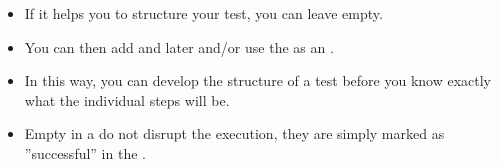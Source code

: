 

\begin{itemize}
\item If it helps you to structure your test, you can leave \gdcases{} empty.
\item You can then add \gdsteps{} and \gdcases{} later and/or use the \gdcase{} as an \gdehandler{}.
\item In this way, you can develop the structure of a test before you know exactly what the individual steps will be. 
\item Empty \gdcases{} in a \gdsuite{} do not disrupt the execution, they are simply marked as ''successful'' in the \gdtestresultview{}. 
\end{itemize}

 

